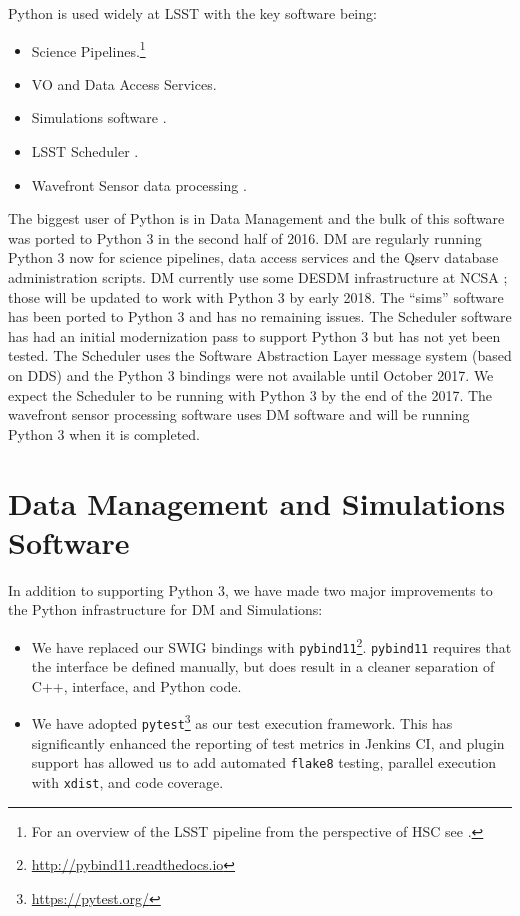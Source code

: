 \documentclass[11pt,twoside]{article}
\begin{document}
Python is used widely at LSST with the key software being:
\begin{itemize}
\item Science Pipelines.\footnote{For an overview of the LSST pipeline from the perspective of HSC see \citet{2017arXiv170506766B}.}
\item VO and Data Access Services.
\item Simulations software \citep{2014SPIE.9150E..14C}.
\item LSST Scheduler \citep{2016SPIE.9910E..13D}.
\item Wavefront Sensor data processing \citep{2016SPIE.9906E..3BT}.
\end{itemize}
The biggest user of Python is in Data Management \citep[DM;][]{O3-1_adassxxv} and the bulk of this software was ported to Python 3 in the second half of 2016.
DM are regularly running Python 3 now for science pipelines, data access services and the Qserv database administration scripts.
DM currently use some DESDM infrastructure at NCSA \citep{2012SPIE.8451E..0DM}; those will be updated to work with Python 3 by early 2018.
The ``sims'' software has been ported to Python 3 and has no remaining issues.
The Scheduler software has had an initial modernization pass to support Python 3 but has not yet been tested.
The Scheduler uses the Software Abstraction Layer \citep[SAL;][]{2016SPIE.9906E..5CM} message system (based on DDS) \citep{2016SPIE.9911E..25R} and the Python 3 bindings were not available until October 2017.
We expect the Scheduler to be running with Python 3 by the end of the 2017.
The wavefront sensor processing software uses DM software and will be running Python 3 when it is completed.

\section{Data Management and Simulations Software}

In addition to supporting Python 3, we have made two major improvements to the Python infrastructure for DM and Simulations:
\begin{itemize}
\item We have replaced our SWIG bindings \citep{beazley2003automated} with \texttt{pybind11}\footnote{\url{http://pybind11.readthedocs.io}}.
      \texttt{pybind11} requires that the interface be defined manually, but does result in a cleaner separation of C++, interface, and Python code.
\item We have adopted \texttt{pytest}\footnote{\url{https://pytest.org/}} as our test execution framework.
      This has significantly enhanced the reporting of test metrics in Jenkins CI, and plugin support has allowed us to add automated \texttt{flake8} testing, parallel execution with \texttt{xdist}, and code coverage.
\end{itemize}
\end{document}

